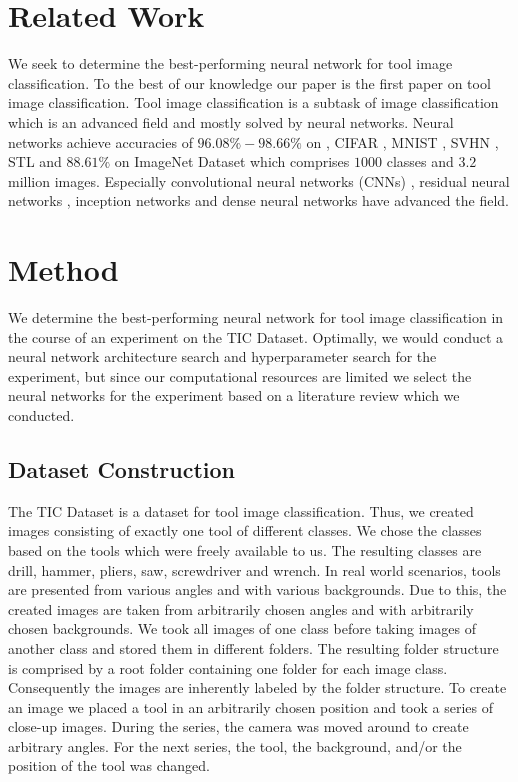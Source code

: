 \documentclass[a4paper, 10pt, journal]{wissarbIEEE}
\begin{document}
\section{Related Work}
\label{sec:relwork}
We seek to determine the best-performing neural network for tool image classification. To the best of our knowledge our paper is the first paper on tool image classification. Tool image classification is a subtask of image classification which is an advanced field and mostly solved by neural networks. Neural networks achieve accuracies of $96.08\%-98.66\%$\cite{Foret.2020, Kabir.2020} on , CIFAR \cite{cifar.2012}, MNIST \cite{mnist.2010}, SVHN \cite{svhn.2011}, STL\cite{stl.2011} and $88.61\%$\cite{Foret.2020} on ImageNet Dataset \cite{imagenet.2019} which comprises $1000$ classes and $3.2$ million images. Especially convolutional neural networks (CNNs) \cite{LeCun.2015b}, residual neural networks \cite{He.2016}, inception networks\cite{Szegedy.2015} and dense neural networks \cite{Huang.2017} have advanced the field.

\section{Method}
\label{sec:metho}
We determine the best-performing neural network for tool image classification in the course of an experiment on the TIC Dataset. Optimally, we would conduct a neural network architecture search and hyperparameter search for the experiment, but since our computational resources are limited we select the neural networks for the experiment based on a literature review which we conducted.

\subsection{Dataset Construction}
The TIC Dataset is a dataset for tool image classification. Thus, we created images consisting of exactly one tool of different classes. We chose the classes based on the tools which were freely available to us. The resulting classes are drill, hammer, pliers, saw, screwdriver and wrench.  In real world scenarios, tools are presented
from various angles and with various backgrounds. Due to this, the created images
are taken from arbitrarily chosen angles and with arbitrarily chosen backgrounds. We took all images of one class before taking images of another class and stored
them in different folders. The resulting folder structure is comprised by a root folder
containing one folder for each image class. Consequently the images are  inherently labeled by the folder structure. To  create an image we placed a tool in an arbitrarily chosen position and took a series of close-up images. During the series, the camera was moved around to create arbitrary angles. For the next series, the tool, the background,
and/or the position of the tool was changed.
\end{document}

